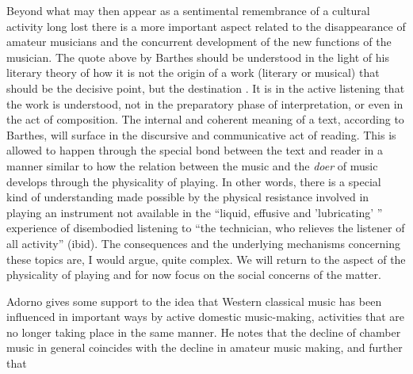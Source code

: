 \documentclass[11pt]{article}
\begin{document}
Beyond what may then appear as a sentimental remembrance of a cultural activity long lost there is a more important aspect related to the disappearance of amateur musicians and the concurrent development of the new functions of the musician. The quote above by Barthes should be understood in the light of his literary theory of how it is not the origin of a work (literary or musical) that should be the decisive point, but the destination \citep[]{barthes77}. It is in the active listening that the work is understood, not in the preparatory phase of interpretation, or even in the act of composition. 
The internal and coherent meaning of a text, according to Barthes, will surface in the discursive and communicative act of reading. This is allowed to happen through the special bond between the text and reader in a manner similar to how the relation between the music and the \emph{doer} of music develops through the physicality of playing. In other words, there is a special kind of understanding made possible by the physical resistance involved in playing an instrument not available in the ``liquid, effusive and 'lubricating' '' \citep[p.150]{barthes77} experience of disembodied listening to ``the technician, who relieves the listener of all activity'' (ibid).
The consequences and the underlying mechanisms concerning these topics are, I would argue, quite complex. We will return to the aspect of the physicality of playing and for now focus on the social concerns of the matter.

Adorno gives some support to the idea that Western classical music has been influenced in important ways by active domestic music-making, activities that are no longer taking place in the same manner. He notes that the decline of chamber music in general coincides with the decline in amateur music making, and further that
\end{document}

